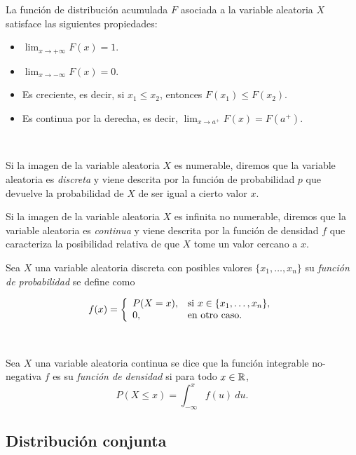 \documentclass[oneside,openright,titlepage,numbers=noenddot,openany,headinclude,footinclude=true,
cleardoublepage=empty,abstractoff,BCOR=5mm,paper=a4,fontsize=12pt,main=spanish]{scrreprt}
\begin{document}
\begin{proposition} La función de distribución acumulada $F$ asociada a la variable aleatoria $X$ satisface las siguientes propiedades:

\begin{itemize}
    \item $\displaystyle \lim_{x\to +\infty} F(x)=1$.
    \item $\displaystyle \lim_{x\to -\infty} F(x)=0$.
    \item Es creciente, es decir, si $x_1 \leq x_2$, entonces $F(x_1) \leq F(x_2)$.
    \item Es continua por la derecha, es decir, $\displaystyle \lim_{x\to a^+} F(x)=F(a^+)$.
\end{itemize}
\end{proposition}\

Si la imagen de la variable aleatoria $X$ es numerable, diremos que la variable aleatoria es \textit{discreta} y viene descrita por la función de probabilidad $p$ que devuelve la probabilidad de $X$ de ser igual a cierto valor $x$. 

Si la imagen de la variable aleatoria $X$ es infinita no numerable, diremos que la variable aleatoria es \textit{continua} y viene descrita por la función de densidad $f$ que caracteriza la posibilidad relativa de que $X$ tome un valor cercano a $x$.\\

\begin{definition}
Sea $X$ una variable aleatoria discreta con posibles valores $\{x_1,\dots,x_n\}$ su \textit{función de probabilidad} se define como 

$$f(x)= \left \{
\begin{array}{l l}
P(X=x), & \mbox{si } x\in \{x_1,\dots,x_n\}, \\
0, & \mbox{en otro caso}.
\end{array}
\right.$$
\end{definition}\

\begin{definition}
Sea $X$ una variable aleatoria continua se dice que la función integrable no-negativa $f$ es su \textit{función de densidad} si para todo $x \in \mathbb{R}$, $$P(X\leq x)=\int_{-\infty}^x f(u) \ du.$$
\end{definition}

\subsection{Distribución conjunta}
\end{document}
